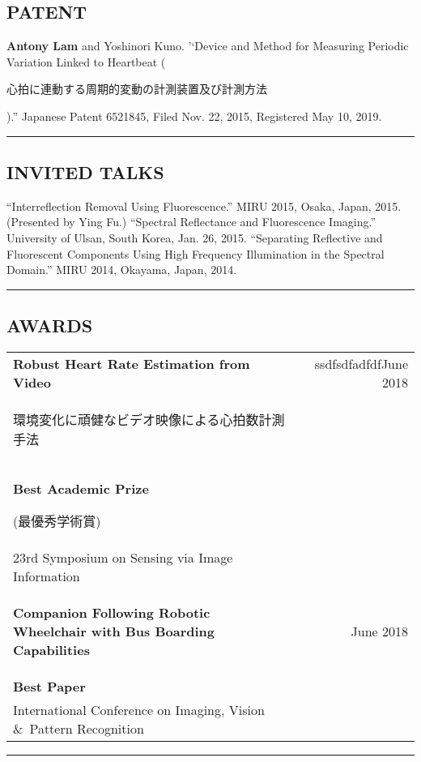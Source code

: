 \documentclass[letterpaper,10pt]{article}
\newcommand{\myline}{ \rule{\textwidth}{0.01in} }
\begin{document}
\subsection*{PATENT}
\textbf{Antony Lam} and Yoshinori Kuno. '`Device and Method for Measuring
Periodic Variation Linked to Heartbeat ({\begin{CJK}{UTF8}{min}\begin{small}心拍に連動する周期的変動の計測装置及び計測方法\end{small}\end{CJK}}).''
Japanese Patent 6521845, Filed Nov. 22, 2015, Registered May 10, 2019. 
\myline
\subsection*{INVITED TALKS}
``Interreflection Removal Using Fluorescence.''  MIRU 2015, Osaka, Japan,
2015. (Presented by Ying Fu.)\newline
``Spectral Reflectance and Fluorescence Imaging.'' University of Ulsan, South
Korea, Jan. 26, 2015.\newline
``Separating Reflective and Fluorescent Components Using High Frequency Illumination
in the Spectral Domain.'' MIRU 2014, Okayama, Japan, 2014.
\myline
\subsection*{AWARDS}
\begin{tabularx}{\textwidth}{b{}r}
\bfseries{Robust Heart Rate Estimation from Video} & {\textcolor[rgb]{1,1,1}{ssdfsdfadfdf}June 2018} \\
{\begin{CJK}{UTF8}{min}\begin{small}環境変化に頑健なビデオ映像による心拍数計測手法\end{small}\end{CJK}} & {} \\
\textbf{Best Academic Prize} \begin{CJK}{UTF8}{min}(最優秀学術賞)\end{CJK} & {} \\
        {23rd Symposium on Sensing via Image Information} & {} \\ \vspace{0.05in}
\bfseries{\begin{small}\textbf{Companion Following Robotic Wheelchair with Bus Boarding Capabilities}\end{small}} & {June 2018} \\
\textbf{Best Paper}& {} \\
        {International Conference on Imaging, Vision \&\ Pattern Recognition} & {} \vspace{0.05in} \\
\end{tabularx}
\newline\newline\newline
\myline
\end{document}
